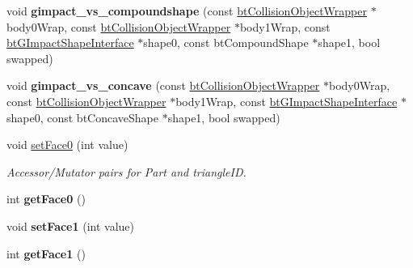 \begin{DoxyCompactItemize}
\item 
\hypertarget{classbt_g_impact_collision_algorithm_a2e4f46acaa4551a7f82ee91e710f925a}{void {\bfseries gimpact\+\_\+vs\+\_\+compoundshape} (const \hyperlink{structbt_collision_object_wrapper}{bt\+Collision\+Object\+Wrapper} $\ast$body0\+Wrap, const \hyperlink{structbt_collision_object_wrapper}{bt\+Collision\+Object\+Wrapper} $\ast$body1\+Wrap, const \hyperlink{classbt_g_impact_shape_interface}{bt\+G\+Impact\+Shape\+Interface} $\ast$shape0, const bt\+Compound\+Shape $\ast$shape1, bool swapped)}\label{classbt_g_impact_collision_algorithm_a2e4f46acaa4551a7f82ee91e710f925a}

\item 
\hypertarget{classbt_g_impact_collision_algorithm_a01b9594871d06ed0148c0af4d5f512b9}{void {\bfseries gimpact\+\_\+vs\+\_\+concave} (const \hyperlink{structbt_collision_object_wrapper}{bt\+Collision\+Object\+Wrapper} $\ast$body0\+Wrap, const \hyperlink{structbt_collision_object_wrapper}{bt\+Collision\+Object\+Wrapper} $\ast$body1\+Wrap, const \hyperlink{classbt_g_impact_shape_interface}{bt\+G\+Impact\+Shape\+Interface} $\ast$shape0, const bt\+Concave\+Shape $\ast$shape1, bool swapped)}\label{classbt_g_impact_collision_algorithm_a01b9594871d06ed0148c0af4d5f512b9}

\item 
\hypertarget{classbt_g_impact_collision_algorithm_a10e8bcaf1a0b97b227f37fbda2d50403}{void \hyperlink{classbt_g_impact_collision_algorithm_a10e8bcaf1a0b97b227f37fbda2d50403}{set\+Face0} (int value)}\label{classbt_g_impact_collision_algorithm_a10e8bcaf1a0b97b227f37fbda2d50403}

\begin{DoxyCompactList}\small\item\em Accessor/\+Mutator pairs for Part and triangle\+I\+D. \end{DoxyCompactList}\item 
\hypertarget{classbt_g_impact_collision_algorithm_a84e98cf28b7a3df2af4db962e13ba7a6}{int {\bfseries get\+Face0} ()}\label{classbt_g_impact_collision_algorithm_a84e98cf28b7a3df2af4db962e13ba7a6}

\item 
\hypertarget{classbt_g_impact_collision_algorithm_aa6d490d3e7d8648dbdeae5c326afd72a}{void {\bfseries set\+Face1} (int value)}\label{classbt_g_impact_collision_algorithm_aa6d490d3e7d8648dbdeae5c326afd72a}

\item 
\hypertarget{classbt_g_impact_collision_algorithm_a047f913d8ad106b2514890ae4ab1fdb0}{int {\bfseries get\+Face1} ()}\label{classbt_g_impact_collision_algorithm_a047f913d8ad106b2514890ae4ab1fdb0}


\end{DoxyCompactItemize}
